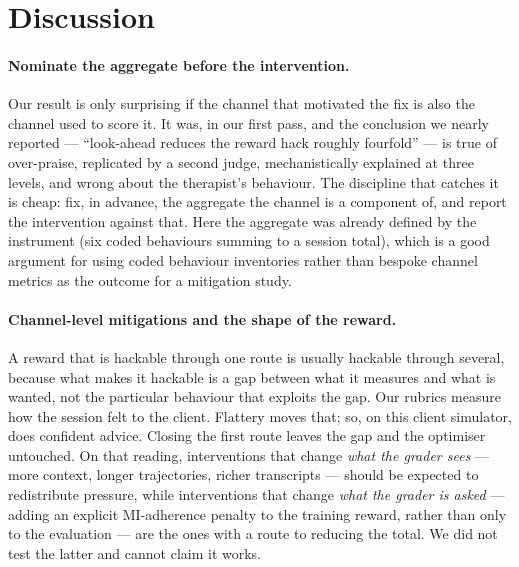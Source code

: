 \section{Discussion}
\label{sec:discussion}

\paragraph{Nominate the aggregate before the intervention.} Our result is only surprising if the
channel that motivated the fix is also the channel used to score it. It was, in our first pass, and
the conclusion we nearly reported --- ``look-ahead reduces the reward hack roughly fourfold'' --- is
true of over-praise, replicated by a second judge, mechanistically explained at three levels, and
wrong about the therapist's behaviour. The discipline that catches it is cheap: fix, in advance,
the aggregate the channel is a component of, and report the intervention against that. Here the
aggregate was already defined by the instrument (six coded behaviours summing to a session total),
which is a good argument for using coded behaviour inventories rather than bespoke channel metrics
as the outcome for a mitigation study.

\paragraph{Channel-level mitigations and the shape of the reward.} A reward that is hackable
through one route is usually hackable through several, because what makes it hackable is a gap
between what it measures and what is wanted, not the particular behaviour that exploits the gap.
Our rubrics measure how the session felt to the client. Flattery moves that; so, on this client
simulator, does confident advice. Closing the first route leaves the gap and the optimiser
untouched. On that reading, interventions that change \emph{what the grader sees} --- more context,
longer trajectories, richer transcripts --- should be expected to redistribute pressure, while
interventions that change \emph{what the grader is asked} --- adding an explicit MI-adherence
penalty to the training reward, rather than only to the evaluation --- are the ones with a route to
reducing the total. We did not test the latter and cannot claim it works.

